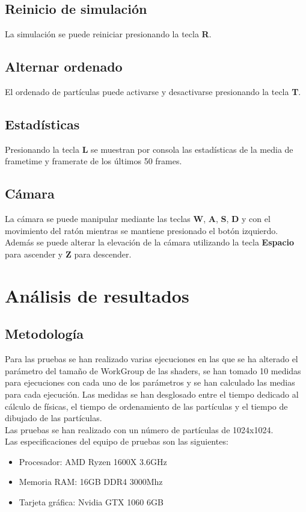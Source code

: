 \documentclass[10pt,oneside,a4paper]{article}
\begin{document}
\subsection{Reinicio de simulación}
La simulación se puede reiniciar presionando la tecla \textbf{R}.

\subsection{Alternar ordenado}
El ordenado de partículas puede activarse y desactivarse presionando la tecla \textbf{T}.

\subsection{Estadísticas}
Presionando la tecla \textbf{L} se muestran por consola las estadísticas de la media de frametime y framerate de los últimos 50 frames.

\subsection{Cámara}
La cámara se puede manipular mediante las teclas \textbf{W}, \textbf{A}, \textbf{S}, \textbf{D} y con el movimiento del ratón mientras se mantiene presionado el botón izquierdo. Además se puede alterar la elevación de la cámara utilizando la tecla \textbf{Espacio} para ascender y \textbf{Z} para descender.

\section{Análisis de resultados}
\subsection{Metodología}
Para las pruebas se han realizado varias ejecuciones en las que se ha alterado el parámetro del tamaño de WorkGroup de las shaders, se han tomado 10 medidas para ejecuciones con cada uno de los parámetros y se han calculado las medias para cada ejecución. Las medidas se han desglosado entre el tiempo dedicado al cálculo de físicas, el tiempo de ordenamiento de las partículas y el tiempo de dibujado de las partículas.\\

Las pruebas se han realizado con un número de partículas de 1024x1024.\\

Las especificaciones del equipo de pruebas son las siguientes:
\begin{itemize}
  \item Procesador: AMD Ryzen 1600X 3.6GHz
  \item Memoria RAM: 16GB DDR4 3000Mhz
  \item Tarjeta gráfica: Nvidia GTX 1060 6GB
\end{itemize}
\end{document}
